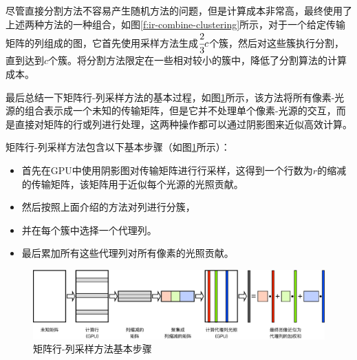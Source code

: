 尽管直接分割方法不容易产生随机方法的问题，但是计算成本非常高，\cite{a:MatrixRow-ColumnSamplingfortheMany-LightProblem}最终使用了上述两种方法的一种组合，如图\ref{f:ir-combine-clustering}所示，对于一个给定传输矩阵的列组成的图，它首先使用采样方法生成$ \cfrac{2}{3}c$个簇，然后对这些簇执行分割，直到达到$c$个簇。将分割方法限定在一些相对较小的簇中，降低了分割算法的计算成本。

最后总结一下矩阵行-列采样方法的基本过程，如图\ref{f:ir-matrix-row-column}所示，该方法将所有像素-光源的组合表示成一个未知的传输矩阵，但是它并不处理单个像素-光源的交互，而是直接对矩阵的行或列进行处理，这两种操作都可以通过阴影图来近似高效计算。

矩阵行-列采样方法包含以下基本步骤（如图\ref{f:ir-matrix-row-column}所示）：

\begin{itemize}
	\item 首先在GPU中使用阴影图对传输矩阵进行行采样，这得到一个行数为$r$的缩减的传输矩阵，该矩阵用于近似每个光源的光照贡献。
	\item 然后按照上面介绍的方法对列进行分簇，
	\item 并在每个簇中选择一个代理列。
	\item 最后累加所有这些代理列对所有像素的光照贡献。
\end{itemize}

\begin{figure}
\begin{fullwidth}
	\includegraphics[width=1.0\thewidth]{figures/ir/matrix-row-column}
	\caption{矩阵行-列采样方法基本步骤}
	\label{f:ir-matrix-row-column}
\end{fullwidth}
\end{figure}



